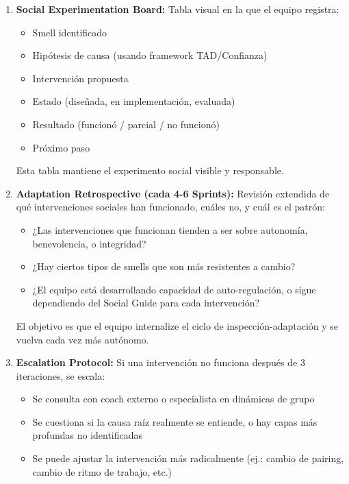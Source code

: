 \begin{enumerate}

\item \textbf{Social Experimentation Board:} Tabla visual en la que el equipo registra:
\begin{itemize}
\item Smell identificado
\item Hipótesis de causa (usando framework TAD/Confianza)
\item Intervención propuesta
\item Estado (diseñada, en implementación, evaluada)
\item Resultado (funcionó / parcial / no funcionó)
\item Próximo paso
\end{itemize}

Esta tabla mantiene el experimento social visible y responsable.

\item \textbf{Adaptation Retrospective (cada 4-6 Sprints):} Revisión extendida de qué intervenciones sociales han funcionado, cuáles no, y cuál es el patrón:
\begin{itemize}
\item ¿Las intervenciones que funcionan tienden a ser sobre autonomía, benevolencia, o integridad?
\item ¿Hay ciertos tipos de smells que son más resistentes a cambio?
\item ¿El equipo está desarrollando capacidad de auto-regulación, o sigue dependiendo del Social Guide para cada intervención?
\end{itemize}

El objetivo es que el equipo internalize el ciclo de inspección-adaptación y se vuelva cada vez más autónomo.

\item \textbf{Escalation Protocol:} Si una intervención no funciona después de 3 iteraciones, se escala:
\begin{itemize}
\item Se consulta con coach externo o especialista en dinámicas de grupo
\item Se cuestiona si la causa raíz realmente se entiende, o hay capas más profundas no identificadas
\item Se puede ajustar la intervención más radicalmente (ej.: cambio de pairing, cambio de ritmo de trabajo, etc.)
\end{itemize}

\end{enumerate}

